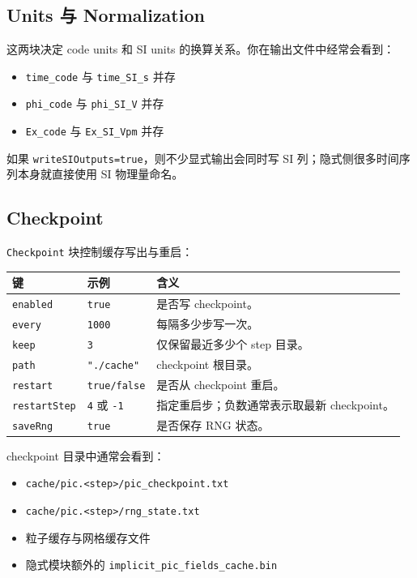 \documentclass[11pt,a4paper]{ctexart}
\newcommand{\code}[1]{\texttt{#1}}
\newcommand{\file}[1]{\texttt{#1}}
\begin{document}
\subsection{Units 与 Normalization}

这两块决定 code units 和 SI units 的换算关系。你在输出文件中经常会看到：

\begin{itemize}
  \item \code{time\_code} 与 \code{time\_SI\_s} 并存
  \item \code{phi\_code} 与 \code{phi\_SI\_V} 并存
  \item \code{Ex\_code} 与 \code{Ex\_SI\_Vpm} 并存
\end{itemize}

如果 \code{writeSIOutputs=true}，则不少显式输出会同时写 SI 列；隐式侧很多时间序列本身就直接使用 SI 物理量命名。

\subsection{Checkpoint}

\code{Checkpoint} 块控制缓存写出与重启：

\begin{longtable}{p{}p{}p{}}
\toprule
键 & 示例 & 含义 \\
\midrule
\endhead
\code{enabled} & \code{true} & 是否写 checkpoint。 \\
\code{every} & \code{1000} & 每隔多少步写一次。 \\
\code{keep} & \code{3} & 仅保留最近多少个 step 目录。 \\
\code{path} & \code{"./cache"} & checkpoint 根目录。 \\
\code{restart} & \code{true/false} & 是否从 checkpoint 重启。 \\
\code{restartStep} & \code{4} 或 \code{-1} & 指定重启步；负数通常表示取最新 checkpoint。 \\
\code{saveRng} & \code{true} & 是否保存 RNG 状态。 \\
\bottomrule
\end{longtable}

checkpoint 目录中通常会看到：

\begin{itemize}
  \item \file{cache/pic.<step>/pic\_checkpoint.txt}
  \item \file{cache/pic.<step>/rng\_state.txt}
  \item 粒子缓存与网格缓存文件
  \item 隐式模块额外的 \file{implicit\_pic\_fields\_cache.bin}
\end{itemize}
\end{document}
